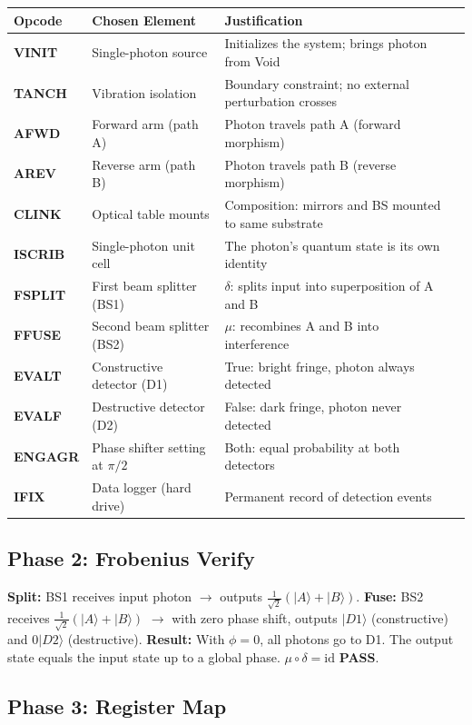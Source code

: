 \documentclass[12pt,a4paper]{article}
\begin{document}
{\small
\begin{tabularx}{\textwidth}{>{\bfseries}p{2.2cm} p{4cm} p{6cm}X}
\toprule
{\bf Opcode} & {\bf Chosen Element} & {\bf Justification} \\
\midrule
VINIT & Single-photon source & Initializes the system; brings photon from Void \\
TANCH & Vibration isolation & Boundary constraint; no external perturbation crosses \\
AFWD & Forward arm (path A) & Photon travels path A (forward morphism) \\
AREV & Reverse arm (path B) & Photon travels path B (reverse morphism) \\
CLINK & Optical table mounts & Composition: mirrors and BS mounted to same substrate \\
ISCRIB & Single-photon unit cell & The photon's quantum state is its own identity \\
FSPLIT & First beam splitter (BS1) & $\delta$: splits input into superposition of A and B \\
FFUSE & Second beam splitter (BS2) & $\mu$: recombines A and B into interference \\
EVALT & Constructive detector (D1) & True: bright fringe, photon always detected \\
EVALF & Destructive detector (D2) & False: dark fringe, photon never detected \\
ENGAGR & Phase shifter setting at $\pi/2$ & Both: equal probability at both detectors \\
IFIX & Data logger (hard drive) & Permanent record of detection events \\
\bottomrule
\end{tabularx}
}

\subsection*{Phase 2: Frobenius Verify}

\textbf{Split:} BS1 receives input photon $\to$ outputs $\frac{1}{\sqrt{2}}(|A\rangle + |B\rangle)$.
\textbf{Fuse:} BS2 receives $\frac{1}{\sqrt{2}}(|A\rangle + |B\rangle)$ $\to$ with zero
phase shift, outputs $|D1\rangle$ (constructive) and $0|D2\rangle$ (destructive).
\textbf{Result:} With $\phi = 0$, all photons go to D1. The output state equals the
input state up to a global phase. $\mu \circ \delta = \mathrm{id}$ \textbf{PASS}.

\subsection*{Phase 3: Register Map}
\end{document}
